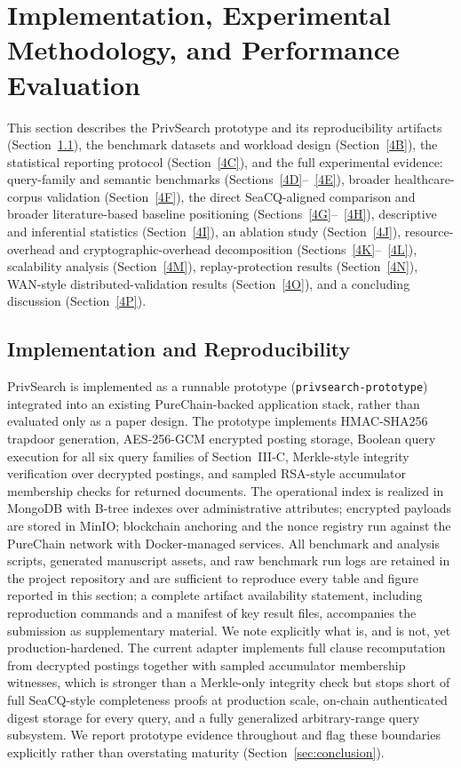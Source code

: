 \section{Implementation, Experimental Methodology, and Performance Evaluation}
\label{4}
This section describes the PrivSearch prototype and its reproducibility artifacts (Section~\ref{4A}), the benchmark datasets and workload design (Section~\ref{4B}), the statistical reporting protocol (Section~\ref{4C}), and the full experimental evidence: query-family and semantic benchmarks (Sections~\ref{4D}--~\ref{4E}), broader healthcare-corpus validation (Section~\ref{4F}), the direct SeaCQ-aligned comparison and broader literature-based baseline positioning (Sections~\ref{4G}--~\ref{4H}), descriptive and inferential statistics (Section~\ref{4I}), an ablation study (Section~\ref{4J}), resource-overhead and cryptographic-overhead decomposition (Sections~\ref{4K}--~\ref{4L}), scalability analysis (Section~\ref{4M}), replay-protection results (Section~\ref{4N}), WAN-style distributed-validation results (Section~\ref{4O}), and a concluding discussion (Section~\ref{4P}).
\subsection{Implementation and Reproducibility}
\label{4A}
PrivSearch is implemented as a runnable prototype (\texttt{privsearch-prototype}) integrated into an existing PureChain-backed application stack, rather than evaluated only as a paper design. The prototype implements HMAC-SHA256 trapdoor generation, AES-256-GCM encrypted posting storage, Boolean query execution for all six query families of Section~III-C, Merkle-style integrity verification over decrypted postings, and sampled RSA-style accumulator membership checks for returned documents. The operational index is realized in MongoDB with B-tree indexes over administrative attributes; encrypted payloads are stored in MinIO; blockchain anchoring and the nonce registry run against the PureChain network with Docker-managed services. All benchmark and analysis scripts, generated manuscript assets, and raw benchmark run logs are retained in the project repository and are sufficient to reproduce every table and figure reported in this section; a complete artifact availability statement, including reproduction commands and a manifest of key result files, accompanies the submission as supplementary material.
We note explicitly what is, and is not, yet production-hardened. The current adapter implements full clause recomputation from decrypted postings together with sampled accumulator membership witnesses, which is stronger than a Merkle-only integrity check but stops short of full SeaCQ-style completeness proofs at production scale, on-chain authenticated digest storage for every query, and a fully generalized arbitrary-range query subsystem. We report prototype evidence throughout and flag these boundaries explicitly rather than overstating maturity (Section~\ref{sec:conclusion}).
